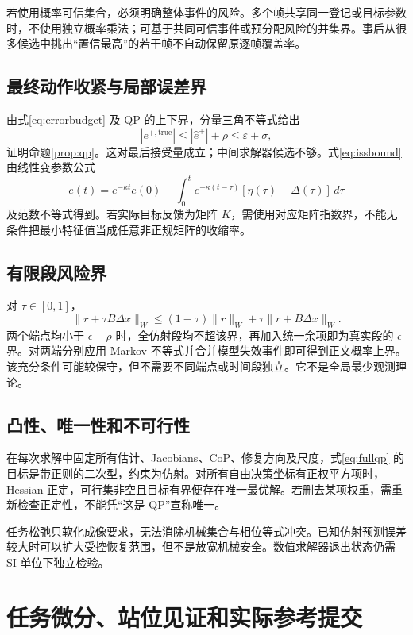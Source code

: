 \documentclass[UTF8,11pt,a4paper,fontset=fandol]{ctexart}
\numberwithin{equation}{section}
\theoremstyle{definition}
\begin{document}
若使用概率可信集合，必须明确整体事件的风险。多个帧共享同一登记或目标参数时，不使用独立概率乘法；可基于共同可信事件或预分配风险的并集界。事后从很多候选中挑出“置信最高”的若干帧不自动保留原逐帧覆盖率。

\subsection{最终动作收紧与局部误差界}
由式\eqref{eq:errorbudget} 及 QP 的上下界，分量三角不等式给出
\begin{equation}
|e^{+,\mathrm{true}}|\le|\widehat e^+|+\rho
\le\varepsilon+\sigma,
\end{equation}
证明命题\ref{prop:qp}。这对最后接受量成立；中间求解器候选不够。式\eqref{eq:issbound} 由线性变参数公式
\begin{equation}
e(t)=e^{-\kappa t}e(0)+
\int_0^t e^{-\kappa(t-\tau)}[\eta(\tau)+\Delta(\tau)]\,d\tau
\end{equation}
及范数不等式得到。若实际目标反馈为矩阵 $K$，需使用对应矩阵指数界，不能无条件把最小特征值当成任意非正规矩阵的收缩率。

\subsection{有限段风险界}
对 $\tau\in[0,1]$，
\begin{equation}
\|r+\tau B\Delta x\|_W
\le(1-\tau)\|r\|_W+\tau\|r+B\Delta x\|_W.
\end{equation}
两个端点均小于 $\epsilon-\rho$ 时，全仿射段均不超该界，再加入统一余项即为真实段的 $\epsilon$ 界。对两端分别应用 Markov 不等式并合并模型失效事件即可得到正文概率上界。该充分条件可能较保守，但不需要不同端点或时间段独立。它不是全局最少观测理论。

\subsection{凸性、唯一性和不可行性}
在每次求解中固定所有估计、Jacobians、CoP、修复方向及尺度，式\eqref{eq:fullqp} 的目标是带正则的二次型，约束为仿射。对所有自由决策坐标有正权平方项时，Hessian 正定，可行集非空且目标有界便存在唯一最优解。若删去某项权重，需重新检查正定性，不能凭“这是 QP”宣称唯一。

任务松弛只软化成像要求，无法消除机械集合与相位等式冲突。已知仿射预测误差较大时可以扩大受控恢复范围，但不是放宽机械安全。数值求解器退出状态仍需 SI 单位下独立检验。

\section{任务微分、站位见证和实际参考提交}
\label{app:phase}
\end{document}
